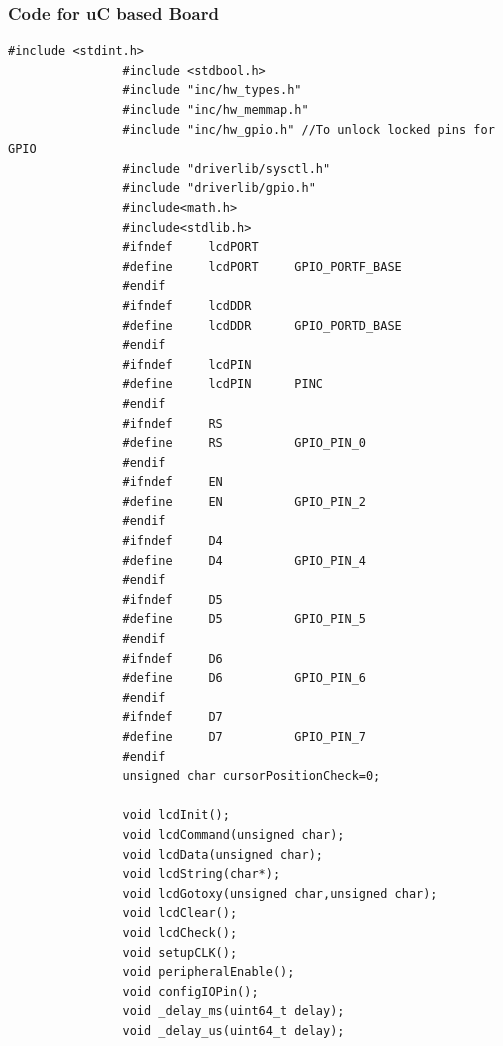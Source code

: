 \documentclass[a4paper,12pt,oneside]{article}
\begin{document}
			\subsubsection{\textbf{Code for uC based Board}}
			\begin{lstlisting}[style=CStyle]
				#include <stdint.h>
				#include <stdbool.h>
				#include "inc/hw_types.h"
				#include "inc/hw_memmap.h"
				#include "inc/hw_gpio.h" //To unlock locked pins for GPIO
				#include "driverlib/sysctl.h"
				#include "driverlib/gpio.h"
				#include<math.h>
				#include<stdlib.h>
				#ifndef     lcdPORT
				#define     lcdPORT     GPIO_PORTF_BASE
				#endif
				#ifndef     lcdDDR
				#define     lcdDDR      GPIO_PORTD_BASE
				#endif
				#ifndef     lcdPIN
				#define     lcdPIN      PINC
				#endif
				#ifndef     RS
				#define     RS          GPIO_PIN_0
				#endif
				#ifndef     EN
				#define     EN          GPIO_PIN_2
				#endif
				#ifndef     D4
				#define     D4          GPIO_PIN_4
				#endif
				#ifndef     D5
				#define     D5          GPIO_PIN_5
				#endif
				#ifndef     D6
				#define     D6          GPIO_PIN_6
				#endif
				#ifndef     D7
				#define     D7          GPIO_PIN_7
				#endif
				unsigned char cursorPositionCheck=0;
				
				void lcdInit();
				void lcdCommand(unsigned char);
				void lcdData(unsigned char);
				void lcdString(char*);
				void lcdGotoxy(unsigned char,unsigned char);
				void lcdClear();
				void lcdCheck();
				void setupCLK();
				void peripheralEnable();
				void configIOPin();
				void _delay_ms(uint64_t delay);
				void _delay_us(uint64_t delay);
				

\end{lstlisting}
\end{document}
